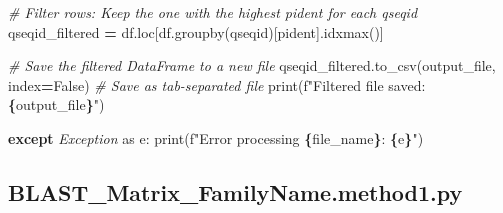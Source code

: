 \documentclass[
]{book}
\newenvironment{Shaded}{\begin{snugshade}}{\end{snugshade}}
\newcommand{\BuiltInTok}[1]{#1}
\newcommand{\CommentTok}[1]{\textcolor[rgb]{0.56,0.35,0.01}{\textit{#1}}}
\newcommand{\ControlFlowTok}[1]{\textcolor[rgb]{0.13,0.29,0.53}{\textbf{#1}}}
\newcommand{\ImportTok}[1]{#1}
\newcommand{\NormalTok}[1]{#1}
\newcommand{\OperatorTok}[1]{\textcolor[rgb]{0.81,0.36,0.00}{\textbf{#1}}}
\newcommand{\PreprocessorTok}[1]{\textcolor[rgb]{0.56,0.35,0.01}{\textit{#1}}}
\newcommand{\SpecialCharTok}[1]{\textcolor[rgb]{0.81,0.36,0.00}{\textbf{#1}}}
\newcommand{\SpecialStringTok}[1]{\textcolor[rgb]{0.31,0.60,0.02}{#1}}
\newcommand{\StringTok}[1]{\textcolor[rgb]{0.31,0.60,0.02}{#1}}
\newcommand{\VariableTok}[1]{\textcolor[rgb]{0.00,0.00,0.00}{#1}}
\begin{document}
\begin{Shaded}
\begin{Highlighting}[]
            \CommentTok{\# Filter rows: Keep the one with the highest pident for each qseqid}
\NormalTok{            qseqid\_filtered }\OperatorTok{=}\NormalTok{ df.loc[df.groupby(}\StringTok{\textquotesingle{}qseqid\textquotesingle{}}\NormalTok{)[}\StringTok{\textquotesingle{}pident\textquotesingle{}}\NormalTok{].idxmax()]}
            
            \CommentTok{\# Save the filtered DataFrame to a new file}
\NormalTok{            qseqid\_filtered.to\_csv(output\_file, index}\OperatorTok{=}\VariableTok{False}\NormalTok{)  }\CommentTok{\# Save as tab{-}separated file}
            \BuiltInTok{print}\NormalTok{(}\SpecialStringTok{f"Filtered file saved: }\SpecialCharTok{\{}\NormalTok{output\_file}\SpecialCharTok{\}}\SpecialStringTok{"}\NormalTok{)}
        
        \ControlFlowTok{except} \PreprocessorTok{Exception} \ImportTok{as}\NormalTok{ e:}
            \BuiltInTok{print}\NormalTok{(}\SpecialStringTok{f"Error processing }\SpecialCharTok{\{}\NormalTok{file\_name}\SpecialCharTok{\}}\SpecialStringTok{: }\SpecialCharTok{\{}\NormalTok{e}\SpecialCharTok{\}}\SpecialStringTok{"}\NormalTok{)}
\end{Highlighting}
\end{Shaded}

\subsection{BLAST\_Matrix\_FamilyName.method1.py}\label{mxfnmeth1-script}
\end{document}
